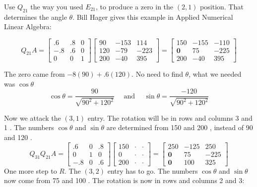 Use $Q_{21}$ the way you used $E_{21}$, to produce a zero in the $(2,1)$ position. That determines the angle $\theta$. Bill Hager gives this example in Applied Numerical Linear Algebra:

\begin{example}[使用Givens进行QR分解]
    \begin{equation}
    Q_{21} A=\left[\begin{array}{rrr}
    .6 & .8 & 0 \\
    -.8 & .6 & 0 \\
    0 & 0 & 1
    \end{array}\right]\left[\begin{array}{rrr}
    90 & -153 & 114 \\
    120 & -79 & -223 \\
    200 & -40 & 395
    \end{array}\right]=\left[\begin{array}{crr}
    150 & -155 & -110 \\
    \mathbf{0} & 75 & -225 \\
    200 & -40 & 395
    \end{array}\right]
    \end{equation}

    The zero came from $-8(90)+.6(120)$. No need to find $\theta$, what we needed was $\cos \theta$
\begin{equation}
\cos \theta=\frac{90}{\sqrt{90^{2}+120^{2}}} \quad \text { and } \quad \sin \theta=\frac{-120}{\sqrt{90^{2}+120^{2}}}
\end{equation}

Now we attack the $(3,1)$ entry. The rotation will be in rows and columns 3 and 1 . The numbers $\cos \theta$ and $\sin \theta$ are determined from 150 and 200 , instead of 90 and 120 .
\begin{equation}
Q_{31} Q_{21} A=\left[\begin{array}{rrr}
.6 & 0 & .8 \\
0 & 1 & 0 \\
-.8 & 0 & .6
\end{array}\right]\left[\begin{array}{rrr}
150 & \cdot & \cdot \\
0 & \cdot & \cdot \\
200 & \cdot & \cdot
\end{array}\right]=\left[\begin{array}{rrr}
250 & -125 & 250 \\
\mathbf{0} & 75 & -225 \\
\mathbf{0} & 100 & 325
\end{array}\right]
\end{equation}
One more step to $R$. The $(3,2)$ entry has to go. The numbers $\cos \theta$ and $\sin \theta$ now come from 75 and 100 . The rotation is now in rows and columns 2 and 3:



\end{example}
